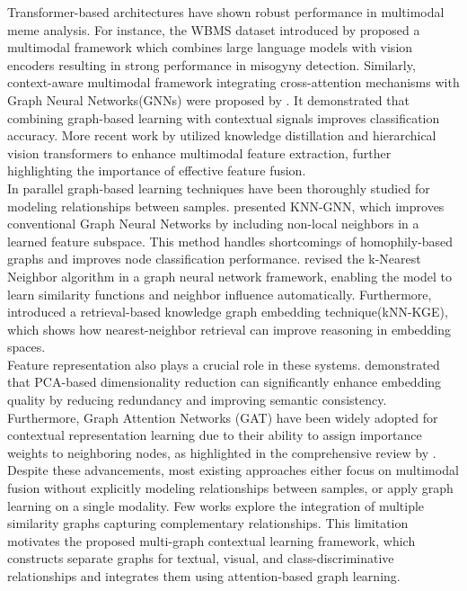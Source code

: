 \documentclass[a4paper]{cas-sc}
\begin{document}
Transformer-based architectures have shown robust performance in multimodal meme analysis. For instance, the WBMS dataset introduced by \cite{kanwar2025wbms} proposed a multimodal framework which combines large language models with vision encoders resulting in strong performance in misogyny detection. Similarly, context-aware multimodal framework integrating cross-attention mechanisms with Graph Neural Networks(GNNs) were proposed by \cite{rehman2025contextaware}. It demonstrated that combining graph-based learning with contextual signals improves classification accuracy. More recent work by \cite{aggarwal2026multimodal} utilized knowledge distillation and hierarchical vision transformers to enhance multimodal feature extraction, further highlighting the importance of effective feature fusion.
\\

In parallel graph-based learning techniques have been thoroughly studied for modeling relationships between samples. \cite{li2024knngnn} presented KNN-GNN, which improves conventional Graph Neural Networks by including non-local neighbors in a learned feature subspace. This method handles shortcomings of homophily-based graphs and improves node classification performance. \cite{kang2021knngnn} revised the k-Nearest Neighbor algorithm in a graph neural network framework, enabling the model to learn similarity functions and neighbor influence automatically. Furthermore, \cite{wang2023knnkge} introduced a retrieval-based knowledge graph embedding technique(kNN-KGE), which shows how nearest-neighbor retrieval can improve reasoning in embedding spaces.
\\

Feature representation also plays a crucial role in these systems. \cite{zhu2024pcabert} demonstrated that PCA-based dimensionality reduction can significantly enhance embedding quality by reducing redundancy and improving semantic consistency. Furthermore, Graph Attention Networks (GAT) have been widely adopted for contextual representation learning due to their ability to assign importance weights to neighboring nodes, as highlighted in the comprehensive review by \cite{vrahatis2024gatreview}.
\\

Despite these advancements, most existing approaches either focus on multimodal fusion without explicitly modeling relationships between samples, or apply graph learning on a single modality. Few works explore the integration of multiple similarity graphs capturing complementary relationships. This limitation motivates the proposed multi-graph contextual learning framework, which constructs separate graphs for textual, visual, and class-discriminative relationships and integrates them using attention-based graph learning.
\end{document}
